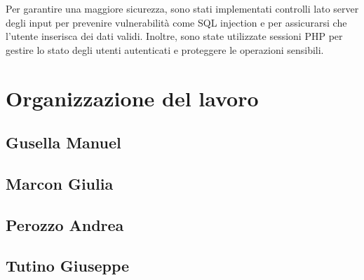 \documentclass[10pt]{article}
\begin{document}
Per garantire una maggiore sicurezza, sono stati implementati controlli lato server degli input per prevenire vulnerabilit\`a come SQL injection e per assicurarsi che l'utente inserisca dei dati validi. Inoltre, sono state utilizzate sessioni PHP per gestire lo stato degli utenti autenticati e proteggere le operazioni sensibili.

\section{Organizzazione del lavoro}
\subsection{Gusella Manuel}
\subsection{Marcon Giulia}
\subsection{Perozzo Andrea}
\subsection{Tutino Giuseppe}
\end{document}
